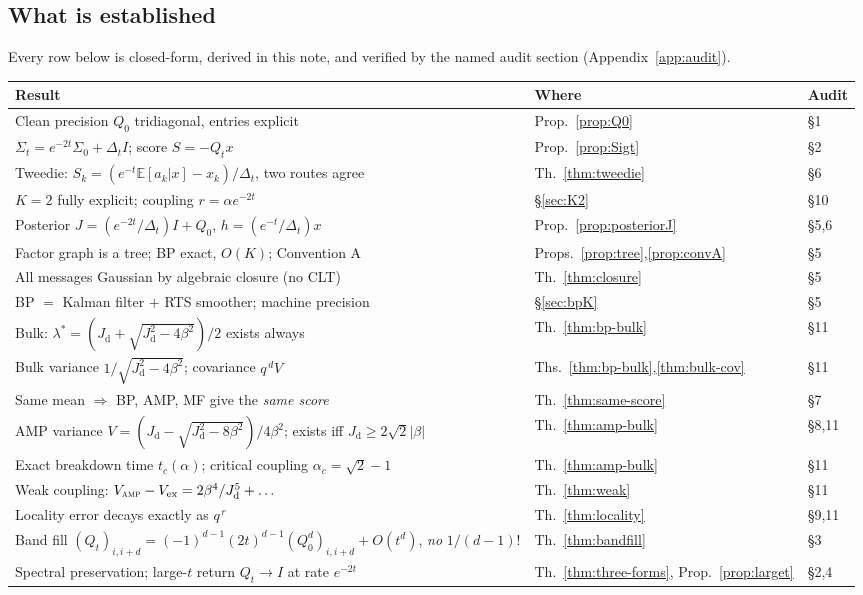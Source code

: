 \documentclass[11pt]{article}
\theoremstyle{definition}
\newcommand{\E}{\mathbb{E}}
\newcommand{\Sig}{\Sigma}
\newcommand{\Dt}{\Delta_t}
\newcommand{\Qt}{Q_t}
\newcommand{\Jd}{J_{\mathrm d}}
\begin{document}
\subsection{What is established}

Every row below is closed-form, derived in this note, and verified by the
named audit section (Appendix~\ref{app:audit}).

\begin{center}\small
\begin{tabular}{@{}p{}ll@{}}
\toprule
Result & Where & Audit\\
\midrule
Clean precision $Q_0$ tridiagonal, entries explicit & Prop.~\ref{prop:Q0} & \S1\\
$\Sig_t=e^{-2t}\Sig_0+\Dt I$; score $S=-\Qt x$ & Prop.~\ref{prop:Sigt} & \S2\\
Tweedie: $S_k=(e^{-t}\E[a_k|x]-x_k)/\Dt$, two routes agree & Th.~\ref{thm:tweedie} & \S6\\
$K=2$ fully explicit; coupling $r=\alpha e^{-2t}$ & \S\ref{sec:K2} & \S10\\
Posterior $J=(e^{-2t}/\Dt)I+Q_0$, $h=(e^{-t}/\Dt)x$ & Prop.~\ref{prop:posteriorJ} & \S5,6\\
Factor graph is a tree; BP exact, $O(K)$; Convention A & Props.~\ref{prop:tree},\ref{prop:convA} & \S5\\
All messages Gaussian by algebraic closure (no CLT) & Th.~\ref{thm:closure} & \S5\\
BP $=$ Kalman filter $+$ RTS smoother; machine precision & \S\ref{sec:bpK} & \S5\\
Bulk: $\lambda^\ast=(\Jd{+}\sqrt{\Jd^2{-}4\beta^2})/2$ exists always & Th.~\ref{thm:bp-bulk} & \S11\\
Bulk variance $1/\sqrt{\Jd^2-4\beta^2}$; covariance $q^{\,d}V$ & Ths.~\ref{thm:bp-bulk},\ref{thm:bulk-cov} & \S11\\
Same mean $\Rightarrow$ BP, AMP, MF give the \emph{same score} & Th.~\ref{thm:same-score} & \S7\\
AMP variance $V=(\Jd{-}\sqrt{\Jd^2{-}8\beta^2})/4\beta^2$; exists iff $\Jd\ge2\sqrt2|\beta|$ & Th.~\ref{thm:amp-bulk} & \S8,11\\
Exact breakdown time $t_c(\alpha)$; critical coupling $\alpha_c=\sqrt2-1$ & Th.~\ref{thm:amp-bulk} & \S11\\
Weak coupling: $V_{\textsc{amp}}-V_{\mathrm{ex}}=2\beta^4/\Jd^5+\dots$ & Th.~\ref{thm:weak} & \S11\\
Locality error decays exactly as $q^{\,r}$ & Th.~\ref{thm:locality} & \S9,11\\
Band fill $(\Qt)_{i,i+d}=(-1)^{d-1}(2t)^{d-1}(Q_0^d)_{i,i+d}+O(t^d)$, \emph{no} $1/(d{-}1)!$ & Th.~\ref{thm:bandfill} & \S3\\
Spectral preservation; large-$t$ return $\Qt\to I$ at rate $e^{-2t}$ & Th.~\ref{thm:three-forms}, Prop.~\ref{prop:larget} & \S2,4\\
\bottomrule
\end{tabular}
\end{center}
\end{document}
